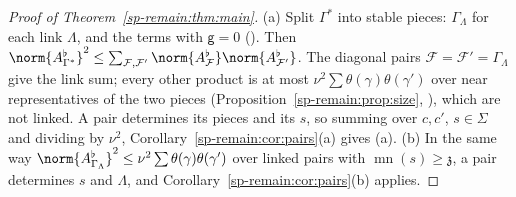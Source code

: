 \begin{proof}[Proof of Theorem~\ref{sp-remain:thm:main}]
(a) Split $\Gamma^*$ into stable pieces: $\Gamma_\Lambda$ for each link $\Lambda$, and the terms with
$\mathsf g=0$ (). Then
$\norm{A^\flat_{\Gamma^*}}^2\le\sum_{\mathcal F,\mathcal F'}\norm{A^\flat_{\mathcal F}}\norm{A^\flat_{\mathcal F'}}$. The
diagonal pairs $\mathcal F=\mathcal F'=\Gamma_\Lambda$ give the link sum; every other product is at most
$\nu^2\sum\theta(\gamma)\theta(\gamma')$ over near representatives of the two pieces
(Proposition~\ref{sp-remain:prop:size}, ), which are not
linked. A pair determines its pieces and its $s$, so summing over $c,c'$, $s\in\Sigma$ and dividing
by $\nu^2$, Corollary~\ref{sp-remain:cor:pairs}(a) gives (a). (b) In the same way
$\norm{A^\flat_{\Gamma_\Lambda}}^2\le\nu^2\sum\theta(\gamma)\theta(\gamma')$ over linked pairs with
$\operatorname{mn}(s)\ge\mathfrak z$, a pair determines $s$ and $\Lambda$, and
Corollary~\ref{sp-remain:cor:pairs}(b) applies.
\end{proof}
